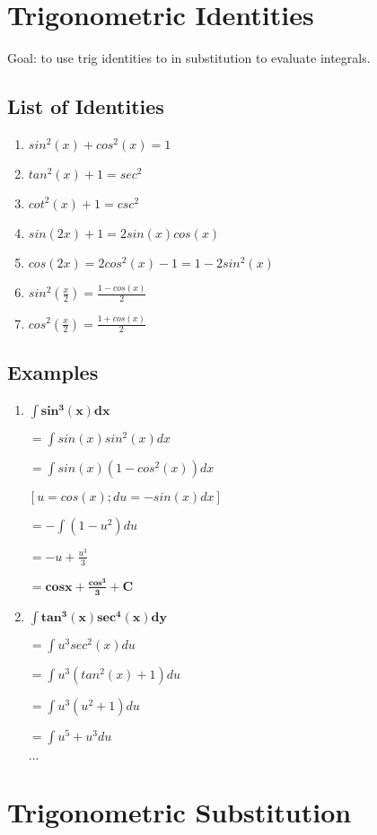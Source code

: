 \documentclass{article}
\begin{document}
\section{Trigonometric Identities}
Goal: to use trig identities to in substitution to evaluate integrals.
\subsection{List of Identities}
\begin{enumerate}
    \item $sin^{2}(x) + cos^{2}(x) = 1$
    \item $tan^{2}(x) + 1 = sec^{2}$
    \item $cot^{2}(x) + 1 = csc^{2}$
    \item $sin(2x) + 1 = 2sin(x)cos(x)$
    \item $cos(2x) = 2cos^{2}(x) - 1 = 1 - 2sin^{2}(x)$
    \item $sin^{2}(\frac{x}{2}) = \frac{1-cos(x)}{2}$
    \item $cos^{2}(\frac{x}{2}) = \frac{1+cos(x)}{2}$
\end{enumerate}
\subsection{Examples}
\begin{enumerate}
    \item $\mathbf{\int sin^{3}(x) dx}$
    
    $ = \int sin(x) sin^2(x) dx$
    
    $ = \int sin(x)(1-cos^2(x)) dx$
    
    $ [u = cos(x); du = -sin(x) dx]$
    
    $ = -\int (1-u^2) du$
    
    $ = -u + \frac{u^3}{3}$
    
    $ \mathbf{= cosx + \frac{cos^3}{3} + C}$
    
    \item $\mathbf{\int tan^3(x) sec^4(x) dy}$
    
    $ = \int u^3 sec^2(x) du$
    
    $ = \int u^3 (tan^2(x) +1) du$
    
    $ = \int u^3 (u^2+1) du$
    
    $ = \int u^5 + u^3 du$
    
    $...$
\end{enumerate}

\section{Trigonometric Substitution}
\end{document}
